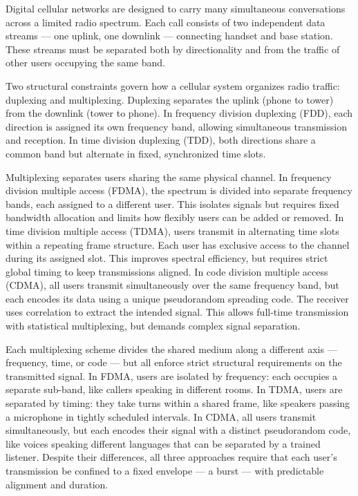 Digital cellular networks are designed to carry many simultaneous conversations across a limited radio spectrum. Each call consists of two independent data streams — one uplink, one downlink — connecting handset and base station. These streams must be separated both by directionality and from the traffic of other users occupying the same band.

Two structural constraints govern how a cellular system organizes radio traffic: duplexing and multiplexing. Duplexing separates the uplink (phone to tower) from the downlink (tower to phone). In frequency division duplexing (FDD), each direction is assigned its own frequency band, allowing simultaneous transmission and reception. In time division duplexing (TDD), both directions share a common band but alternate in fixed, synchronized time slots.

Multiplexing separates users sharing the same physical channel. In frequency division multiple access (FDMA), the spectrum is divided into separate frequency bands, each assigned to a different user. This isolates signals but requires fixed bandwidth allocation and limits how flexibly users can be added or removed. In time division multiple access (TDMA), users transmit in alternating time slots within a repeating frame structure. Each user has exclusive access to the channel during its assigned slot. This improves spectral efficiency, but requires strict global timing to keep transmissions aligned. In code division multiple access (CDMA), all users transmit simultaneously over the same frequency band, but each encodes its data using a unique pseudorandom spreading code. The receiver uses correlation to extract the intended signal. This allows full-time transmission with statistical multiplexing, but demands complex signal separation.

Each multiplexing scheme divides the shared medium along a different axis — frequency, time, or code — but all enforce strict structural requirements on the transmitted signal. In FDMA, users are isolated by frequency: each occupies a separate sub-band, like callers speaking in different rooms. In TDMA, users are separated by timing: they take turns within a shared frame, like speakers passing a microphone in tightly scheduled intervals. In CDMA, all users transmit simultaneously, but each encodes their signal with a distinct pseudorandom code, like voices speaking different languages that can be separated by a trained listener. Despite their differences, all three approaches require that each user’s transmission be confined to a fixed envelope — a burst — with predictable alignment and duration.

